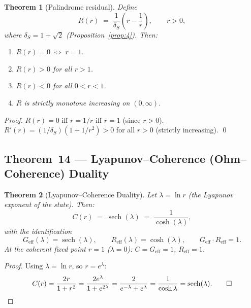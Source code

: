 \documentclass[12pt,a4paper]{article}
\theoremstyle{plain}
\newtheorem{theorem}{Theorem}[section]
\theoremstyle{definition}
\theoremstyle{remark}
\newcommand{\dS}{\delta_S}        %
\newcommand{\Geff}{G_{\mathrm{eff}}}
\newcommand{\Reff}{R_{\mathrm{eff}}}
\begin{document}
\begin{theorem}[Palindrome residual]\label{thm:12}
  Define
  \begin{equation}
    R(r) \;=\; \frac{1}{\dS}\!\left(r - \frac{1}{r}\right),
    \qquad r>0,
    \label{eq:palindrome-residual}
  \end{equation}
  where $\dS = 1+\sqrt{2}$ (Proposition~\ref{prop:4}).  Then:
  \begin{enumerate}
    \item $R(r) = 0 \;\Leftrightarrow\; r = 1$.
    \item $R(r) > 0$ for all $r > 1$.
    \item $R(r) < 0$ for all $0 < r < 1$.
    \item $R$ is strictly monotone increasing on $(0,\infty)$.
  \end{enumerate}
\end{theorem}

\begin{proof}
  $R(r) = 0$ iff $r = 1/r$ iff $r=1$ (since $r>0$).
  $R'(r) = (1/\dS)(1 + 1/r^2) > 0$ for all $r>0$ (strictly increasing). \qed
\end{proof}

\subsection{Theorem~14 — Lyapunov--Coherence (Ohm--Coherence) Duality}

\begin{theorem}[Lyapunov--Coherence Duality]\label{thm:14}
  Let $\lambda = \ln r$ (the \emph{Lyapunov exponent} of the state).  Then:
  \begin{equation}
    C(r) \;=\; \operatorname{sech}(\lambda)
         \;=\; \frac{1}{\cosh(\lambda)},
    \label{eq:sech-duality}
  \end{equation}
  with the identification
  \begin{equation}
    \Geff(\lambda) = \operatorname{sech}(\lambda),\qquad
    \Reff(\lambda) = \cosh(\lambda),\qquad
    \Geff\cdot\Reff = 1.
    \label{eq:ohm-coherence}
  \end{equation}
  At the coherent fixed point $r=1$ ($\lambda=0$):
  $C = \Geff = 1$, $\Reff = 1$.
\end{theorem}

\begin{proof}
  Using $\lambda = \ln r$, so $r = e^\lambda$:
  \[
    C(r) = \frac{2r}{1+r^2}
         = \frac{2e^\lambda}{1+e^{2\lambda}}
         = \frac{2}{e^{-\lambda}+e^\lambda}
         = \frac{1}{\cosh\lambda}
         = \operatorname{sech}(\lambda). \qed
  \]
\end{proof}
\end{document}
